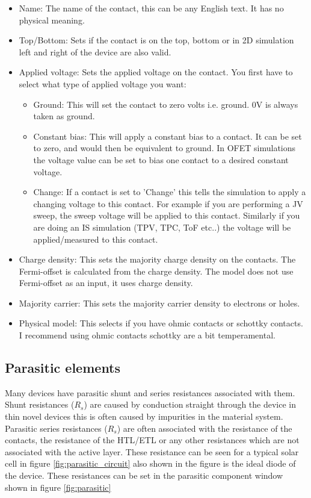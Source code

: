 \begin{itemize}
  \item Name: The name of the contact, this can be any English text. It has no physical meaning.
  \item Top/Bottom: Sets if the contact is on the top, bottom or in 2D simulation left and right of the device are also valid.
  \item Applied voltage: Sets the applied voltage on the contact. You first have to select what type of applied voltage you want:
		\begin{itemize}
		\item Ground: This will set the contact to zero volts i.e. ground. 0V is always taken as ground.
		\item Constant bias: This will apply a constant bias to a contact.  It can be set to zero, and would then be equivalent to ground.  In OFET simulations the voltage value can be set to bias one contact to a desired constant voltage.
		\item Change: If a contact is set to 'Change' this tells the simulation to apply a changing voltage to this contact. For example if you are performing a JV sweep, the sweep voltage will be applied to this contact.  Similarly if you are doing an IS simulation (TPV, TPC, ToF etc..) the voltage will be applied/measured to this contact.
		\end{itemize}
  \item Charge density: This sets the majority charge density on the contacts. The Fermi-offset is calculated from the charge density. The model does not use Fermi-offset as an input, it uses charge density.
  \item Majority carrier: This sets the majority carrier density to electrons or holes.
  \item Physical model: This selects if you have ohmic contacts or schottky contacts. I recommend using ohmic contacts schottky are a bit temperamental.

\end{itemize}



\subsection{Parasitic elements}
\label{sec:parasitic}

Many devices have parasitic shunt and series resistances associated with them.  Shunt resistances ($R_{s}$) are caused by conduction straight through the device in thin novel devices this is often caused by impurities in the material system.  Parasitic series resistances ($R_{s}$) are often associated with the resistance of the contacts, the resistance of the HTL/ETL or any other resistances which are not associated with the active layer.  These resistance can be seen for a typical solar cell in figure \ref{fig:parasitic_circuit} also shown in the figure is the ideal diode of the device. These resistances can be set in the parasitic component window shown in figure \ref{fig:parasitic}


